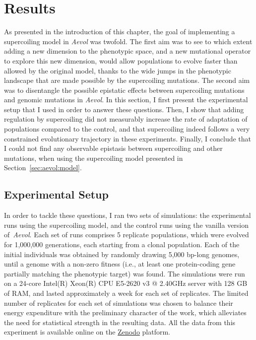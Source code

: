 \section{Results}
\label{sec:aevol:results}

As presented in the introduction of this chapter, the goal of implementing a supercoiling model in \emph{Aevol} was twofold.
The first aim was to see to which extent adding a new dimension to the phenotypic space, and a new mutational operator to explore this new dimension, would allow populations to evolve faster than allowed by the original model, thanks to the wide jumps in the phenotypic landscape that are made possible by the supercoiling mutations.
The second aim was to disentangle the possible epistatic effects between supercoiling mutations and genomic mutations in \emph{Aevol}.
In this section, I first present the experimental setup that I used in order to answer these questions.
Then, I show that adding regulation by supercoiling did not measurably increase the rate of adaptation of populations compared to the control, and that supercoiling indeed follows a very constrained evolutionary trajectory in these experiments.
Finally, I conclude that I could not find any observable epistasis between supercoiling and other mutations, when using the supercoiling model presented in Section~\ref{sec:aevol:model}.

\subsection{Experimental Setup}

In order to tackle these questions, I ran two sets of simulations: the experimental runs using the supercoiling model, and the control runs using the vanilla version of \emph{Aevol}.
Each set of runs comprises 5 replicate populations, which were evolved for 1,000,000 generations, each starting from a clonal population.
Each of the initial individuals was obtained by randomly drawing 5,000 bp-long genomes, until a genome with a non-zero fitness (i.e., at least one protein-coding gene partially matching the phenotypic target) was found.
The simulations were run on a 24-core Intel(R) Xeon(R) CPU E5-2620 v3 @ 2.40GHz server with 128 GB of RAM, and lasted approximately a week for each set of replicates.
The limited number of replicates for each set of simulations was chosen to balance their energy expenditure with the preliminary character of the work, which alleviates the need for statistical strength in the resulting data.
All the data from this experiment is available online on the \href{https://doi.org/10.5281/zenodo.7307545}{Zenodo} platform.

